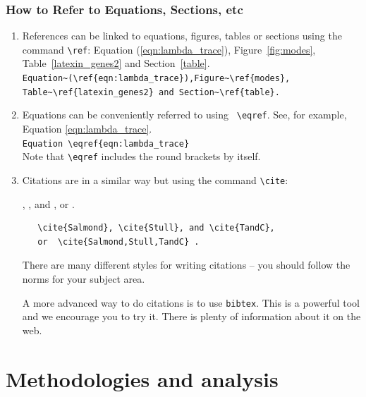 \documentclass[11pt]{book}
\begin{document}
\subsection{How to Refer to Equations, Sections, etc}%
 \begin{enumerate}
 \item References can be linked to equations, figures, tables or sections using the command 
 \verb+\ref+:
 Equation (\ref{eqn:lambda_trace}),  Figure~\ref{fig:modes},  Table~\ref{latexin_genes2} and Section~\ref{table}.\\
\verb+Equation~(\ref{eqn:lambda_trace}),Figure~\ref{modes},+\\
\verb+Table~\ref{latexin_genes2} and Section~\ref{table}.+


\item 
Equations can be conveniently  referred to using \verb+ \eqref+. See, for example,  Equation \eqref{eqn:lambda_trace}. \\
\verb+Equation \eqref{eqn:lambda_trace}+\\
Note that \verb+\eqref+ includes the round brackets by itself. 

\item  Citations are in a similar way but using the command \verb+\cite+:

  \cite{Salmond}, \cite{Stull}, and \cite{TandC}, 
   or  \cite{Salmond,Stull,TandC} .
   
  \begin{verbatim}   
   \cite{Salmond}, \cite{Stull}, and \cite{TandC}, 
   or  \cite{Salmond,Stull,TandC} .
 \end{verbatim} 

There are many different styles for writing citations -- you should follow the norms for your subject area.

A more advanced way to do citations is to use \verb+bibtex+.  This is a powerful tool and we encourage you to try it.  There is plenty of information about it on the web.

 
 \end{enumerate}
 
 
 
\chapter{Methodologies and analysis}
\end{document}
